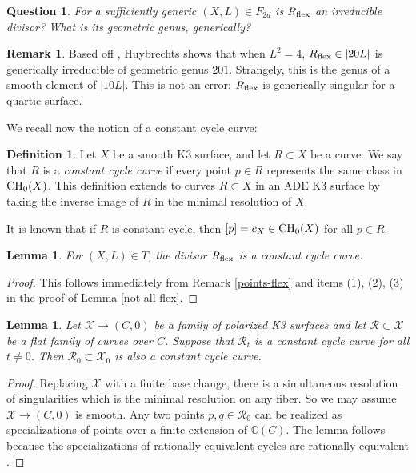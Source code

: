 \documentclass{amsart}
\newtheorem{lemma}[theorem]{Lemma}
\newtheorem{question}[theorem]{Question}
\theoremstyle{definition}
\newtheorem{definition}[theorem]{Definition}
\newtheorem{remark}[theorem]{Remark}
\newcommand{\C}{\mathbb{C}}
\begin{document}
\begin{question} For a sufficiently generic $(X,L)\in F_{2d}$ is $R_{\rm flex}$
an irreducible divisor? What is its geometric genus, generically? \end{question}

\begin{remark} Based off \cite{welters1981abel},
Huybrechts \cite[Prop.~8.8]{huybrechts2013curves}
shows that when $L^2=4$, $R_{\rm flex}\in |20L|$ is generically
irreducible of geometric genus $201$. 
Strangely, this is the genus of a smooth
element of $|10L|$.
This is not an
error: $R_{\rm flex}$ is generically singular
for a quartic surface. \end{remark} 

We recall now the notion of a constant cycle curve:

\begin{definition} Let $X$ be a smooth K3 surface, and let $R\subset X$ be a curve.
 We say that $R$ is a {\it constant cycle curve} if every point $p\in R$ represents
 the same class in ${\rm CH}_0(X)$. This definition extends to curves $R\subset X$ in
 an ADE K3 surface by taking the inverse image of $R$
 in the minimal resolution of $X$. \end{definition}
 
 It is known that if $R$ is constant cycle, then $[p]=c_X\in {\rm
   CH}_0(X)$ for all $p\in R$.
 
 \begin{lemma} For $(X,L)\in T$,
 the divisor $R_{\rm flex}$ is a constant cycle curve. \end{lemma}
 
 \begin{proof} This follows immediately from Remark \ref{points-flex} and items
 (1), (2), (3) in the proof of Lemma \ref{not-all-flex}.
 \end{proof}
 
\begin{lemma}\label{specialize} Let $\mathcal{X}\to (C,0)$ be a family of polarized K3 surfaces
and let $\mathcal{R}\subset \mathcal{X}$ be a flat family of curves over $C$. Suppose
that $\mathcal{R}_t$ is a constant cycle curve for all $t\neq 0$. Then
$\mathcal{R}_0\subset \mathcal{X}_0$ is also a constant cycle curve. \end{lemma}

\begin{proof} Replacing $\mathcal{X}$ with a finite base change,
there is a simultaneous resolution of singularities which is the minimal
resolution on any fiber. So we may assume $\mathcal{X}\to (C,0)$
is smooth. Any two points $p,q\in \mathcal{R}_0$ can
be realized as specializations of points over a finite extension of $\C(C)$.
The lemma follows because the specializations of 
rationally equivalent cycles are rationally equivalent
\cite[Cor.~20.3]{fulton2016intersection}. \end{proof}
\end{document}
